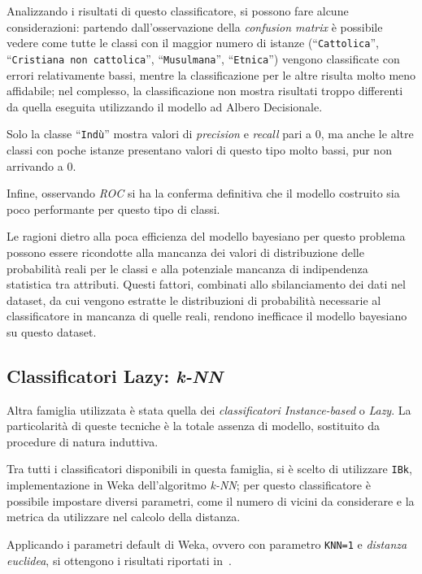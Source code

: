 \documentclass[a4paper,11pt,twoside,notitlepage,final]{scrartcl}
\begin{document}
Analizzando i risultati di questo classificatore, si possono fare alcune considerazioni:
partendo dall'osservazione della \emph{confusion matrix} è possibile vedere come tutte le classi con il maggior numero di istanze (``\texttt{Cattolica}'', ``\texttt{Cristiana non cattolica}'', ``\texttt{Musulmana}'', ``\texttt{Etnica}'')
vengono classificate con errori relativamente bassi, mentre la classificazione per le altre risulta molto meno affidabile; nel complesso, la classificazione non mostra risultati troppo differenti da quella eseguita utilizzando il modello ad Albero Decisionale.

Solo la classe ``\texttt{Indù}'' mostra valori di \emph{precision} e \emph{recall} pari a \(0\), ma anche le altre classi con poche istanze presentano valori di questo tipo molto bassi, pur non arrivando a \(0\).

Infine, osservando \emph{ROC} si ha la conferma definitiva che il modello costruito sia poco performante per questo tipo di classi.

Le ragioni dietro alla poca efficienza del modello bayesiano per questo problema possono essere ricondotte alla mancanza dei valori di distribuzione delle probabilità reali per le classi e alla potenziale mancanza di indipendenza statistica tra attributi.
Questi fattori, combinati allo sbilanciamento dei dati nel dataset, da cui vengono estratte le distribuzioni di probabilità necessarie al classificatore in mancanza di quelle reali, rendono inefficace il modello bayesiano su questo dataset.

\subsection{Classificatori Lazy: \emph{k-NN}}\label{subsec:ibk}

Altra famiglia utilizzata è stata quella dei \emph{classificatori Instance-based} o \emph{Lazy}.
La particolarità di queste tecniche è la totale assenza di modello, sostituito da procedure di natura induttiva.

Tra tutti i classificatori disponibili in questa famiglia, si è scelto di utilizzare \texttt{IBk}, implementazione in Weka dell'algoritmo \emph{k-NN};
per questo classificatore è possibile impostare diversi parametri, come il numero di vicini da considerare e la metrica da utilizzare nel calcolo della distanza.

Applicando i parametri default di Weka, ovvero con parametro \texttt{KNN=1} e \emph{distanza euclidea}, si ottengono i risultati riportati in~.
\end{document}
